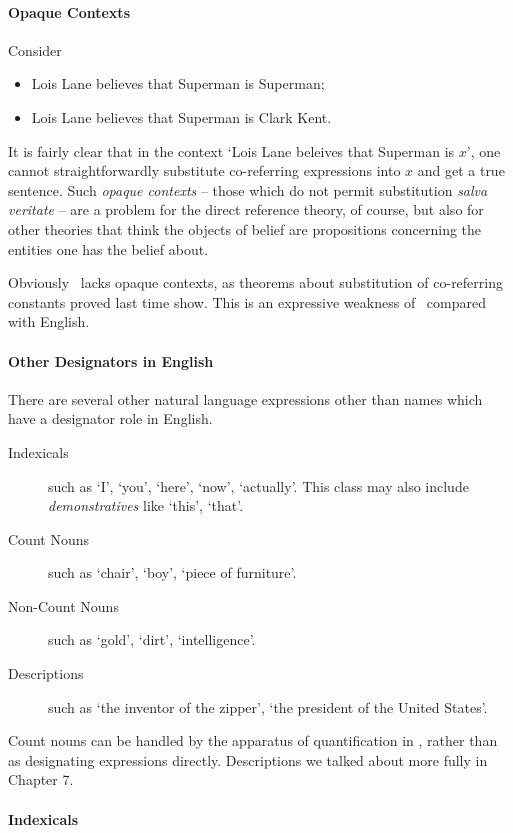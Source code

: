 \paragraph{Opaque Contexts}

 Consider \begin{itemize}
	\item Lois Lane believes that Superman is Superman;
	\item Lois Lane believes that Superman is Clark Kent.
\end{itemize}
It is fairly clear that in the context `Lois Lane beleives that Superman is $x$', one cannot straightforwardly substitute co-referring expressions into $x$ and get a true sentence. Such \emph{opaque contexts} – those which do not permit substitution \emph{salva veritate} – are a problem for the direct reference theory, of course, but also for other theories that think the objects of belief are propositions concerning the entities one has the belief about. 

Obviously \ltwo\ lacks opaque contexts, as theorems about substitution of co-referring constants proved last time show. This is an expressive weakness of \ltwo\ compared with English.



\paragraph{Other Designators in English}

There are several other natural language expressions other than names which have a designator role in English. \begin{description}
	\item [Indexicals] such as `I', `you', `here', `now', `actually'. This class may also include \emph{demonstratives} like `this', `that'.
	\item [Count Nouns] such as `chair', `boy', `piece of furniture'.
	\item [Non-Count Nouns] such as `gold', `dirt', `intelligence'.
	\item [Descriptions] such as `the inventor of the zipper', `the president of the United States'. 
\end{description}

Count nouns can be handled by the apparatus of quantification in \ltwo, rather than as designating expressions directly. Descriptions we talked about  more fully in Chapter 7.

\paragraph{Indexicals}

